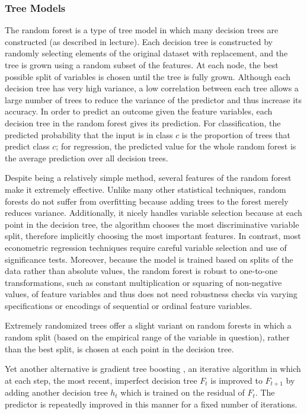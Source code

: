 \documentclass[12pt]{article}
\begin{document}
\subsubsection{Tree Models}

The random forest \cite{breiman2001random} is a type of tree model in which many decision trees are constructed (as described in lecture). Each decision tree is constructed by randomly selecting elements of the original dataset with replacement, and the tree is grown using a random subset of the features. At each node, the best possible split of variables is chosen until the tree is fully grown. Although each decision tree has very high variance, a low correlation between each tree allows a large number of trees to reduce the variance of the predictor and thus increase its accuracy. In order to predict an outcome given the feature variables, each decision tree in the random forest gives its prediction. For classification, the predicted probability that the input is in class $c$ is the proportion of trees that predict class $c$; for regression, the predicted value for the whole random forest is the average prediction over all decision trees.

Despite being a relatively simple method, several features of the random forest make it extremely effective. Unlike many other statistical techniques, random forests do not suffer from overfitting because adding trees to the forest merely reduces variance. Additionally, it nicely handles variable selection because at each point in the decision tree, the algorithm chooses the most discriminative variable split, therefore implicitly choosing the most important features. In contrast, most econometric regression techniques require careful variable selection and use of significance tests. Moreover, because the model is trained based on splits of the data rather than absolute values, the random forest is robust to one-to-one transformations, such as constant multiplication or squaring of non-negative values, of feature variables and thus does not need robustness checks via varying specifications or encodings of sequential or ordinal feature variables. 

Extremely randomized trees \cite{geurts2006extremely} offer a slight variant on random forests in which a random split (based on the empirical range of the variable in question), rather than the best split, is chosen at each point in the decision tree. 

Yet another alternative is gradient tree boosting \cite{chen2016xgboost}, an iterative algorithm in which at each step, the most recent, imperfect decision tree $F_t$ is improved to $F_{t+1}$ by adding another decision tree $h_t$ which is trained on the residual of $F_t$. The predictor is repeatedly improved in this manner for a fixed number of iterations.   
\end{document}
